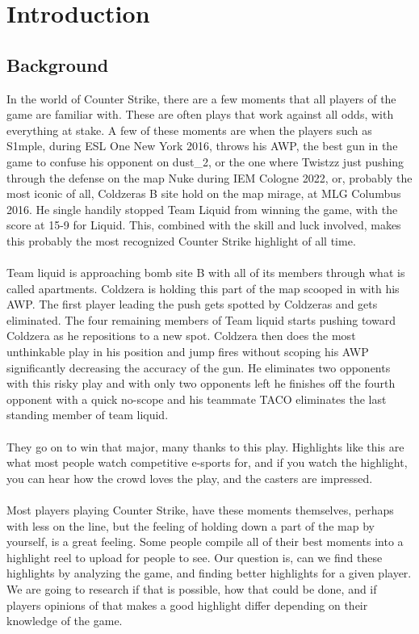 \chapter{Introduction}
\label{chp:introduction}  %
\section{Background}
In the world of Counter Strike, there are a few moments that all players of the game are familiar with. These are often plays that work against all odds, with everything at stake. A few of these moments are when the players such as S1mple, during ESL One New York 2016, throws his AWP, the best gun in the game to confuse his opponent on dust\_2, or the one where Twistzz just pushing through the defense on the map Nuke during IEM Cologne 2022, or, probably the most iconic of all, Coldzeras B site hold on the map mirage, at MLG Columbus 2016. He single handily stopped Team Liquid from winning the game, with the score at 15-9 for Liquid. This, combined with the skill and luck involved, makes this probably the most recognized Counter Strike highlight of all time.\\\\
Team liquid is approaching bomb site B with all of its members through what is called apartments. Coldzera is holding this part of the map scooped in with his AWP. The first player leading the push gets spotted by Coldzeras and gets eliminated. The four remaining members of Team liquid starts pushing toward Coldzera as he repositions to a new spot. Coldzera then does the most unthinkable play in his position and jump fires without scoping his AWP significantly decreasing the accuracy of the gun. He eliminates two opponents with this risky play and with only two opponents left he finishes off the fourth opponent with a quick no-scope and his teammate TACO eliminates the last standing member of team liquid.\\\\
They go on to win that major, many thanks to this play. Highlights like this are what most people watch competitive e-sports for, and if you watch the highlight, you can hear how the crowd loves the play, and the casters are impressed.\\\\
Most players playing Counter Strike, have these moments themselves, perhaps with less on the line, but the feeling of holding down a part of the map by yourself, is a great feeling. Some people compile all of their best moments into a highlight reel to upload for people to see. Our question is, can we find these highlights by analyzing the game, and finding better highlights for a given player. We are going to research if that is possible, how that could be done, and if players opinions of that makes a good highlight differ depending on their knowledge of the game.\\\\

